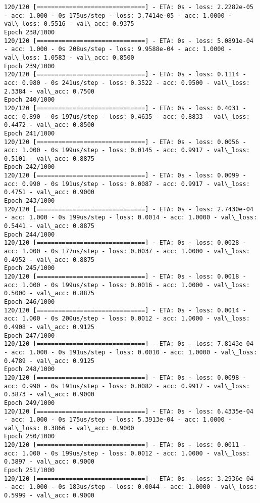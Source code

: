 \documentclass[11pt]{article}
\begin{document}
\begin{Verbatim}[commandchars=\\\{\}]
120/120 [==============================] - ETA: 0s - loss: 2.2282e-05 - acc: 1.000 - 0s 175us/step - loss: 3.7414e-05 - acc: 1.0000 - val\_loss: 0.5516 - val\_acc: 0.9375
Epoch 238/1000
120/120 [==============================] - ETA: 0s - loss: 5.0891e-04 - acc: 1.000 - 0s 208us/step - loss: 9.9588e-04 - acc: 1.0000 - val\_loss: 1.0583 - val\_acc: 0.8500
Epoch 239/1000
120/120 [==============================] - ETA: 0s - loss: 0.1114 - acc: 0.980 - 0s 241us/step - loss: 0.3522 - acc: 0.9500 - val\_loss: 2.3384 - val\_acc: 0.7500
Epoch 240/1000
120/120 [==============================] - ETA: 0s - loss: 0.4031 - acc: 0.890 - 0s 197us/step - loss: 0.4635 - acc: 0.8833 - val\_loss: 0.4472 - val\_acc: 0.8500
Epoch 241/1000
120/120 [==============================] - ETA: 0s - loss: 0.0056 - acc: 1.000 - 0s 199us/step - loss: 0.0145 - acc: 0.9917 - val\_loss: 0.5101 - val\_acc: 0.8875
Epoch 242/1000
120/120 [==============================] - ETA: 0s - loss: 0.0099 - acc: 0.990 - 0s 191us/step - loss: 0.0087 - acc: 0.9917 - val\_loss: 0.4751 - val\_acc: 0.9000
Epoch 243/1000
120/120 [==============================] - ETA: 0s - loss: 2.7430e-04 - acc: 1.000 - 0s 199us/step - loss: 0.0014 - acc: 1.0000 - val\_loss: 0.5441 - val\_acc: 0.8875
Epoch 244/1000
120/120 [==============================] - ETA: 0s - loss: 0.0028 - acc: 1.000 - 0s 177us/step - loss: 0.0037 - acc: 1.0000 - val\_loss: 0.4952 - val\_acc: 0.8875
Epoch 245/1000
120/120 [==============================] - ETA: 0s - loss: 0.0018 - acc: 1.000 - 0s 199us/step - loss: 0.0016 - acc: 1.0000 - val\_loss: 0.5000 - val\_acc: 0.8875
Epoch 246/1000
120/120 [==============================] - ETA: 0s - loss: 0.0014 - acc: 1.000 - 0s 200us/step - loss: 0.0012 - acc: 1.0000 - val\_loss: 0.4908 - val\_acc: 0.9125
Epoch 247/1000
120/120 [==============================] - ETA: 0s - loss: 7.8143e-04 - acc: 1.000 - 0s 191us/step - loss: 0.0010 - acc: 1.0000 - val\_loss: 0.4789 - val\_acc: 0.9125
Epoch 248/1000
120/120 [==============================] - ETA: 0s - loss: 0.0098 - acc: 0.990 - 0s 191us/step - loss: 0.0082 - acc: 0.9917 - val\_loss: 0.3873 - val\_acc: 0.9000
Epoch 249/1000
120/120 [==============================] - ETA: 0s - loss: 6.4335e-04 - acc: 1.000 - 0s 175us/step - loss: 5.3913e-04 - acc: 1.0000 - val\_loss: 0.3866 - val\_acc: 0.9000
Epoch 250/1000
120/120 [==============================] - ETA: 0s - loss: 0.0011 - acc: 1.000 - 0s 199us/step - loss: 0.0012 - acc: 1.0000 - val\_loss: 0.3897 - val\_acc: 0.9000
Epoch 251/1000
120/120 [==============================] - ETA: 0s - loss: 3.2936e-04 - acc: 1.000 - 0s 183us/step - loss: 0.0044 - acc: 1.0000 - val\_loss: 0.5999 - val\_acc: 0.9000

\end{Verbatim}
\end{document}
